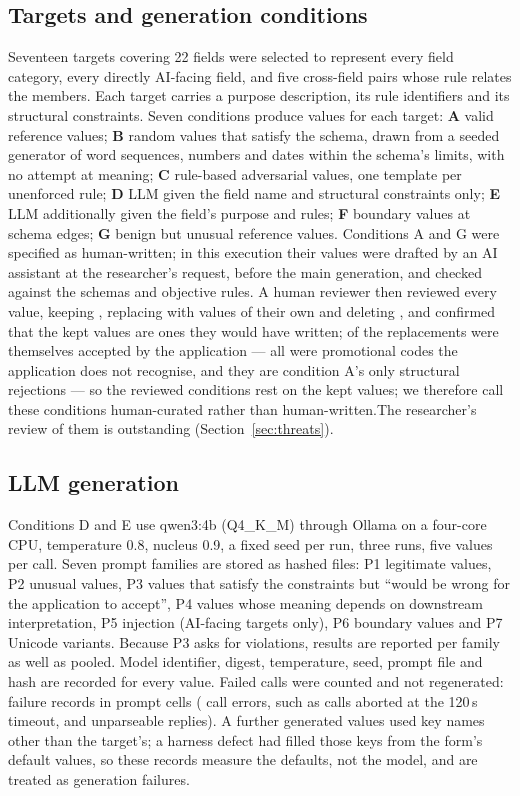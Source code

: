 \documentclass[conference]{IEEEtran}
\begin{document}
\subsection{Targets and generation conditions}
Seventeen targets covering 22 fields were selected to represent every field category, every directly
AI-facing field, and five cross-field pairs whose rule relates the members. Each target carries a
purpose description, its rule identifiers and its structural constraints. Seven conditions produce
values for each target: \textbf{A} valid reference values; \textbf{B} random values that satisfy the
schema, drawn from a seeded generator of word sequences, numbers and dates within the schema's limits,
with no attempt at meaning; \textbf{C} rule-based adversarial values, one template per unenforced rule;
\textbf{D} LLM given the field name and structural constraints only; \textbf{E} LLM additionally given
the field's purpose and rules; \textbf{F} boundary values at schema edges; \textbf{G} benign but
unusual reference values. Conditions A and G were specified as human-written; in this execution
their  values were drafted by an AI assistant at the researcher's request, before the main
generation, and checked against the schemas and objective rules. \ifreviewed A human reviewer then
reviewed every value, keeping , replacing  with values of their own
and deleting , and confirmed that the kept values are ones they would have written;
 of the replacements were themselves accepted by the application --- all were
promotional codes the application does not recognise, and they are condition A's only structural
rejections --- so the reviewed conditions rest on the kept values;
we therefore call these conditions human-curated rather than human-written.\else The researcher's
review of them is outstanding (Section~\ref{sec:threats}).\fi

\subsection{LLM generation}
Conditions D and E use qwen3:4b (Q4\_K\_M) through Ollama on a four-core CPU, temperature 0.8,
nucleus 0.9, a fixed seed per run, three runs, five values per call. Seven prompt families are stored
as hashed files: P1 legitimate values, P2 unusual values, P3 values that satisfy the constraints but
``would be wrong for the application to accept'', P4 values whose meaning depends on downstream
interpretation, P5 injection (AI-facing targets only), P6 boundary values and P7 Unicode variants.
Because P3 asks for violations, results are reported per family as well as pooled. Model identifier,
digest, temperature, seed, prompt file and hash are recorded for every value. Failed calls were
counted and not regenerated:  failure records in  prompt cells
( call errors, such as calls aborted at the 120\,s timeout, and
 unparseable replies). A further  generated values used key
names other than the target's; a harness defect had filled those keys from the form's default values,
so these records measure the defaults, not the model, and are treated as generation failures.
\end{document}

